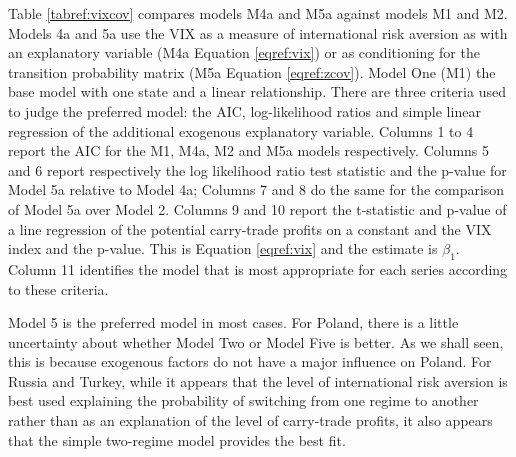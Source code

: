 \documentclass[12pt, a4paper, oneside]{article}\usepackage[]{graphicx}\usepackage[]{color}
\begin{document}
Table \ref{tabref:vixcov} compares models M4a and M5a against models M1 and M2.  Models 4a and 5a use the VIX as a measure of international risk aversion as with an explanatory variable (M4a Equation \ref{eqref:vix}) or as conditioning for the transition probability matrix (M5a Equation \ref{eqref:zcov}).  Model One (M1) the base model with one state and a linear relationship. There are three criteria used to judge the preferred model: the AIC, log-likelihood ratios and simple linear regression of the additional exogenous explanatory variable. Columns 1 to 4 report the AIC for the M1, M4a, M2 and M5a models respectively.  Columns 5 and 6 report respectively the log likelihood ratio test statistic and the p-value for Model 5a relative to Model 4a; Columns 7 and 8 do the same for the comparison of Model 5a over Model 2.  Columns 9 and 10 report the t-statistic and p-value of a line regression of the potential carry-trade profits on a constant and the VIX index and the p-value. This is Equation \ref{eqref:vix} and the estimate is $\beta_1$.  Column 11 identifies the model that is most appropriate for each series according to these criteria.

Model 5 is the preferred model in most cases.  For Poland, there is a little uncertainty about whether Model Two or Model Five is better.  As we shall seen, this is because exogenous factors do not have a major influence on Poland. For Russia and Turkey, while it appears that the level of international risk aversion is best used explaining the probability of switching from one regime to another rather than as an explanation of the level of carry-trade profits, it also appears that the simple two-regime model provides the best fit.
\end{document}
